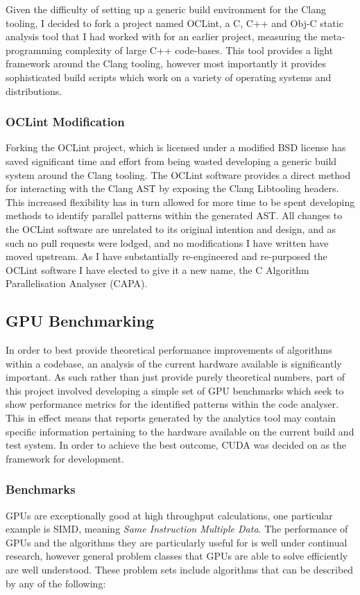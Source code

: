 Given the difficulty of setting up a generic build environment for the Clang tooling, I decided to
fork a project named OCLint\cite{oclint}, a C, C++ and Obj-C static analysis tool that I had worked
with for an earlier project, measuring the meta-programming complexity of large C++ code-bases.  This tool provides a light framework around the Clang tooling, however most
importantly it provides sophisticated build scripts which work on a variety of operating systems and
distributions.

\subsubsection{OCLint Modification} 
Forking the OCLint project, which is licensed under a modified BSD license has saved significant
time and effort from being wasted developing a generic build system around the Clang tooling. The
OCLint software provides a direct method for interacting with the Clang AST by exposing the Clang
Libtooling headers. This increased flexibility has in turn allowed for more time to be spent
developing methods to identify parallel patterns within the generated AST. All changes to the OCLint
software are unrelated to its original intention and design, and as such no pull requests were
lodged, and no modifications I have written have moved upstream. As I have substantially
re-engineered and re-purposed the OCLint software I have elected to give it a new name, the C
Algorithm Parallelisation Analyser (CAPA).

\subsection{GPU Benchmarking}
In order to best provide theoretical performance improvements of algorithms within a codebase, an
analysis of the current hardware available is significantly important. As such rather than just
provide purely theoretical numbers, part of this project involved developing a simple set of GPU
benchmarks which seek to show performance metrics for the identified patterns within the code
analyser. This in effect means that reports generated by the analytics tool may contain specific
information pertaining to the hardware available on the current build and test system. In order to
achieve the best outcome, CUDA was decided on as the framework for development.

\subsubsection{Benchmarks}
GPUs are exceptionally good at high throughput calculations, one particular example is SIMD, meaning
\emph{Same Instruction Multiple Data}. The performance of GPUs and the algorithms they are
particularly useful for is well under continual research, however general problem classes that GPUs
are able to solve efficiently are well understood. These problem sets include algorithms that can be
described by any of the following:

